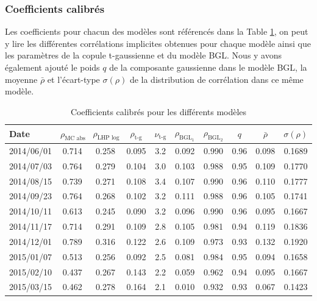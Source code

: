 \subsubsection{Coefficients calibrés}

Les coefficients pour chacun des modèles sont référencés dans la Table \ref{tab:calibrated_parameters},
on peut y lire les différentes corrélations implicites obtenues pour chaque modèle ainsi que les 
paramètres de la copule t-gaussienne et du modèle BGL. Nous y avons également ajouté le poids $q$ de la 
composante gaussienne dans le modèle BGL, la moyenne $\bar{\rho}$ et l'écart-type $\sigma(\rho)$ de la 
distribution de corrélation dans ce même modèle.

\begin{table}[H]
\centering
\begin{tabular}{lccccccccc}
\toprule
Date & $\rho_{\text{MC abs}}$ & $\rho_{\text{LHP log}}$ & $\rho_{\text{t-g}}$ & $\nu_{\text{t-g}}$ & $\rho_{\text{BGL}_1}$ & $\rho_{\text{BGL}_2}$ & $q$ & $\bar{\rho}$ & $\sigma(\rho)$ \\
\midrule
2014/06/01 & 0.714 & 0.258 & 0.095 & 3.2 & 0.092 & 0.990 & 0.96 & 0.098 & 0.1689 \\
2014/07/03 & 0.764 & 0.279 & 0.104 & 3.0 & 0.103 & 0.988 & 0.95 & 0.109 & 0.1770 \\
2014/08/15 & 0.739 & 0.271 & 0.108 & 3.4 & 0.107 & 0.990 & 0.96 & 0.110 & 0.1777 \\
2014/09/23 & 0.764 & 0.268 & 0.102 & 3.2 & 0.111 & 0.988 & 0.96 & 0.105 & 0.1741 \\
2014/10/11 & 0.613 & 0.245 & 0.090 & 3.2 & 0.096 & 0.990 & 0.96 & 0.095 & 0.1667 \\
2014/11/17 & 0.714 & 0.291 & 0.109 & 2.8 & 0.105 & 0.981 & 0.94 & 0.119 & 0.1836 \\
2014/12/01 & 0.789 & 0.316 & 0.122 & 2.6 & 0.109 & 0.973 & 0.93 & 0.132 & 0.1920 \\
2015/01/07 & 0.513 & 0.256 & 0.092 & 2.5 & 0.081 & 0.984 & 0.95 & 0.094 & 0.1658 \\
2015/02/10 & 0.437 & 0.267 & 0.143 & 2.2 & 0.059 & 0.962 & 0.94 & 0.095 & 0.1667 \\
2015/03/15 & 0.462 & 0.278 & 0.164 & 2.1 & 0.010 & 0.932 & 0.93 & 0.067 & 0.1423 \\
\bottomrule
\end{tabular}
\caption{Coefficients calibrés pour les différents modèles}
\label{tab:calibrated_parameters}
\end{table}


